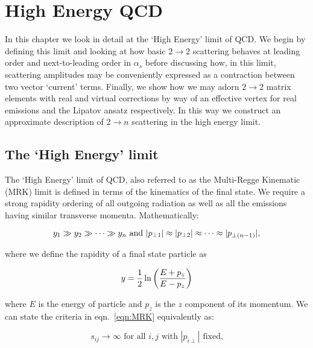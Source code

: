 
\chapter{High Energy QCD}
	\label{chap:HEQCD}

	In this chapter we look in detail at the `High Energy' limit of QCD.  We begin by defining this limit and
	looking at how basic $2\rightarrow2$ scattering behaves at leading order and next-to-leading order in
	$\alpha_s$ before discussing how, in this limit, scattering amplitudes may be conveniently expressed as
	a contraction between two vector `current' terms.  Finally, we show how we may adorn $2\to2$ matrix
	elements with real and virtual corrections by way of an effective vertex for real emissions and the Lipatov
	ansatz respectively.  In this way we construct an approximate description of $2\to n$ scattering in the high
	energy limit.

\section{The `High Energy' limit}
	\label{sub:HElimit}

	The `High Energy' limit of QCD, also referred to as the Multi-Regge Kinematic (MRK) limit is
	defined in terms of the kinematics of the final state.  We require a strong rapidity ordering
	of all outgoing radiation as well as all the emissions having similar transverse momenta.
	Mathematically:

	\begin{equation}
		y_1\gg y_2\gg\cdots\gg\\y_n \text{ and } |p_{\perp1}| \approx |p_{\perp2}| \approx\cdots\approx|p_{\perp(n-1)}|,
		\label{eqn:MRK}
	\end{equation}

		where we define the rapidity of a final state particle as

	\begin{equation}
		y = \frac{1}{2}\ln\left(\frac{E+p_z}{E-p_z}\right)
		\label{eqn:rap}
	\end{equation}

	where $E$ is the energy of particle and $p_z$ is the $z$ component of its momentum. We can
	state the criteria in eqn.~\eqref{eqn:MRK} equivalently as:

	\begin{equation}
		s_{ij}\rightarrow\infty\text{ for all } i, j\text{ with }|p_{i\perp}|\text{ fixed,}
	\end{equation}

